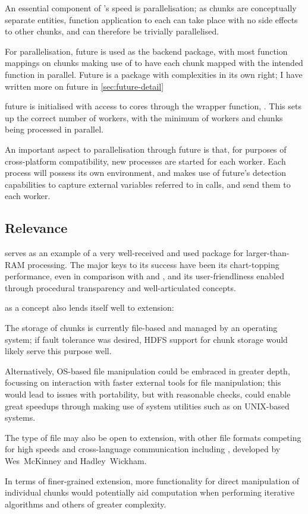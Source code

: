 An essential component of 's speed is parallelisation; as
chunks are conceptually separate entities, function application to each
can take place with no side effects to other chunks, and can therefore
be trivially parallelised.

For parallelisation, future is used as the backend package, with most
function mappings on chunks making use of 
to have each chunk mapped with the intended function in parallel. Future
is a package with complexities in its own right; I have written more on
future in \cref{sec:future-detail}

future is initialised with access to cores through the wrapper function,
\cite{zj19:_key}.
This sets up the correct number of workers, with the minimum of workers
and chunks being processed in parallel.

An important aspect to parallelisation through future is that, for
purposes of cross-platform compatibility, new \R{} processes are started
for each worker\cite{zj19:_using}. Each process will possess its own
environment, and  makes use of future's detection capabilities
to capture external variables referred to in calls, and send them to
each worker.

\subsection{Relevance}\label{sec:relevance}

 serves as an example of a very well-received and used package
for larger-than-RAM processing. The major keys to its success have been
its chart-topping performance, even in comparison with  and ,
and its user-friendliness enabled through procedural transparency and
well-articulated concepts.

 as a concept also lends itself well to extension:

The storage of chunks is currently file-based and managed by an
operating system; if fault tolerance was desired, HDFS support for chunk
storage would likely serve this purpose well.

Alternatively, OS-based file manipulation could be embraced in greater
depth, focussing on interaction with faster external tools for file
manipulation; this would lead to issues with portability, but with
reasonable checks, could enable great speedups through making use of
system utilities such as  on UNIX-based systems.

The type of file may also be open to extension, with other file formats
competing for high speeds and cross-language communication including , developed by Wes~McKinney and Hadley~Wickham\cite{wes16}.

In terms of finer-grained extension, more functionality for direct
manipulation of individual chunks would potentially aid computation when
performing iterative algorithms and others of greater complexity.

